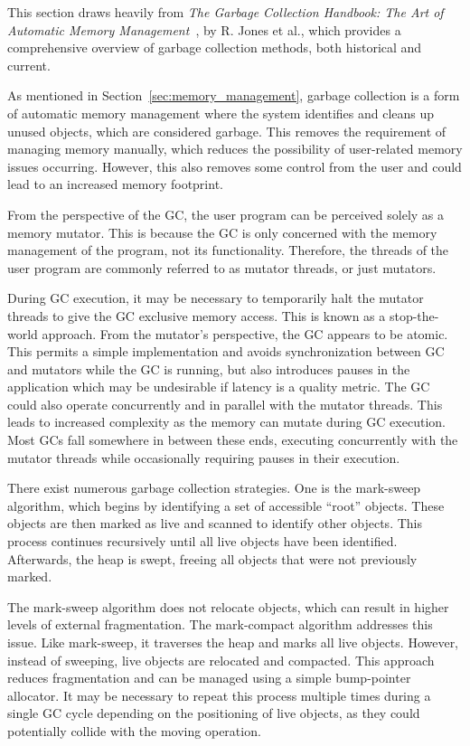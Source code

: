 
This section draws heavily from \textit{The Garbage Collection Handbook: The Art of Automatic Memory Management}~\cite{gchandbook}, by R. Jones et al., which provides a comprehensive overview of garbage collection methods, both historical and current.

As mentioned in Section~\ref{sec:memory_management}, garbage collection is a form of automatic memory management where the system identifies and cleans up unused objects, which are considered garbage. This removes the requirement of managing memory manually, which reduces the possibility of user-related memory issues occurring. However, this also removes some control from the user and could lead to an increased memory footprint.

From the perspective of the GC, the user program can be perceived solely as a memory mutator. This is because the GC is only concerned with the memory management of the program, not its functionality. Therefore, the threads of the user program are commonly referred to as mutator threads, or just mutators.

During GC execution, it may be necessary to temporarily halt the mutator threads to give the GC exclusive memory access. This is known as a stop-the-world approach. From the mutator's perspective, the GC appears to be atomic. This permits a simple implementation and avoids synchronization between GC and mutators while the GC is running, but also introduces pauses in the application which may be undesirable if latency is a quality metric. The GC could also operate concurrently and in parallel with the mutator threads. This leads to increased complexity as the memory can mutate during GC execution. Most GCs fall somewhere in between these ends, executing concurrently with the mutator threads while occasionally requiring pauses in their execution.

There exist numerous garbage collection strategies. One is the mark-sweep algorithm, which begins by identifying a set of accessible ``root'' objects. These objects are then marked as live and scanned to identify other objects. This process continues recursively until all live objects have been identified. Afterwards, the heap is swept, freeing all objects that were not previously marked.

The mark-sweep algorithm does not relocate objects, which can result in higher levels of external fragmentation. The mark-compact algorithm addresses this issue. Like mark-sweep, it traverses the heap and marks all live objects. However, instead of sweeping, live objects are relocated and compacted. This approach reduces fragmentation and can be managed using a simple bump-pointer allocator. It may be necessary to repeat this process multiple times during a single GC cycle depending on the positioning of live objects, as they could potentially collide with the moving operation.

